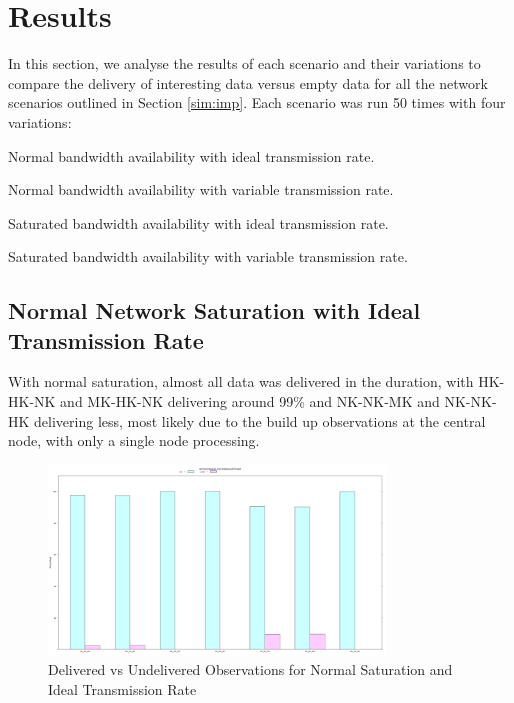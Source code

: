 	

\section{Results}\label{sim:res}

In this section, we analyse the results of each scenario and their variations to compare the delivery of interesting data versus empty data for all the network scenarios outlined in Section \ref{sim:imp}. Each scenario was run 50 times with four variations:
\begin{description}
	\item Normal bandwidth availability with ideal transmission rate.
	\item Normal bandwidth availability with variable transmission rate.
	\item Saturated bandwidth availability with ideal transmission rate.
	\item Saturated bandwidth availability with variable transmission rate.
\end{description}

\subsection{Normal Network Saturation with Ideal Transmission Rate}

With normal saturation, almost all data was delivered in the duration, with HK-HK-NK and MK-HK-NK delivering around 99\% and NK-NK-MK and NK-NK-HK delivering less, most likely due to the build up observations at the central node, with only a single node processing.

	\begin{figure}[h]
	\centering
	\includegraphics[width=0.8\textwidth]{Chap7/figures/plots/normal_ideal/delvsundel_percent.png}
	\caption{Delivered vs Undelivered Observations for Normal Saturation and Ideal Transmission Rate}
	\label{fig:sim:res:norm:ideal:delundel}
	\end{figure}


